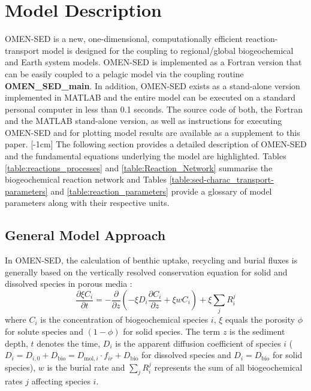 \documentclass[gmd, manuscript]{copernicus}
\begin{document}
\section{Model Description}\label{sec:model_description}
OMEN-SED is a new, one-dimensional, computationally efficient reaction-transport model is designed for the coupling to regional/global biogeochemical and Earth system models. 
OMEN-SED is implemented as a Fortran version that can be easily coupled to a pelagic model via the coupling routine \textsf{\textbf{OMEN\_SED\_main}}. 
In addition, OMEN-SED exists as a stand-alone version implemented in MATLAB and the entire model can be executed on a standard personal computer in less than 0.1 seconds. 
The source code of both, the Fortran and the MATLAB stand-alone version, as well as instructions for executing OMEN-SED and for plotting model results are available as a supplement to this paper.
[-1cm]%
The following section provides a detailed description of OMEN-SED and the fundamental equations underlying the model are highlighted. 
Tables \ref{table:reactions_processes} and \ref{table:Reaction_Network} summarise the biogeochemical reaction network and Tables \ref{table:sed-charac_transport-parameters} 
and \ref{table:reaction_parameters} provide a glossary of model parameters along with their respective units. 

\subsection {General Model Approach} \label{subsec:GeneralModelApproach}
In OMEN-SED, the calculation of benthic uptake, recycling and burial fluxes is generally based on the vertically resolved conservation equation for solid and dissolved species in porous media 
\citep[e.g.][]{berner_early_1980, boudreau1997diagenetic}:
\begin{equation} 
\frac{\partial \xi C_i}{\partial t}=-\frac{\partial}{\partial z}\left( -\xi D_i \frac{\partial C_i}{\partial z} +\xi w C_i\right)    +\xi \sum_j R_i^j \label{eq:Eq_generaldiagenetic}
\end{equation}
where $C_i$ is the concentration of biogeochemical species $i$, $\xi$ equals the porosity $\phi$ for solute species and $(1-\phi)$ for solid species. The term $z$ is the sediment depth, $t$ denotes the time, 
$D_i$ is the apparent diffusion coefficient of species $i$ ($D_i=D_{i,0}+D_{\mathrm{bio}}=D_{\mathrm{mol},i}\cdot f_{ir}+D_{\mathrm{bio}}$ for dissolved species 
and $D_i=D_{\mathrm{bio}}$ for solid species), $w$ is the burial rate  and $\sum_j R_i^j$ represents the sum of all biogeochemical rates $j$ affecting species $i$. 
\end{document}
